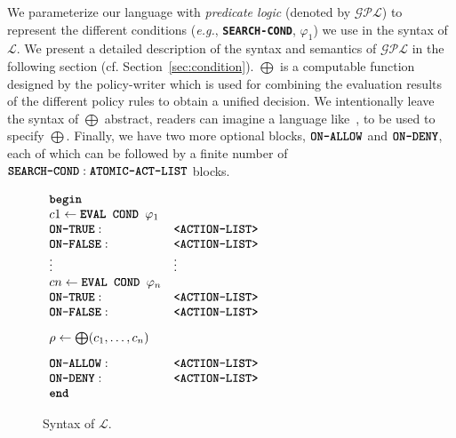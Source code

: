 \documentclass{sig-alternate}
\newcommand{\eg}{\textit{e.g.}\xspace}
\newcommand{\state}{\ensuremath{\pi}\xspace}
\newcommand{\policyfunc}{\ensuremath{\Psi}\xspace}
\newcommand{\planguage}{\ensuremath{\mathbf{\mathcal{GPL}}}\xspace}
\newcommand{\funcname}[1]{\textbf{\texttt{#1}}}
\newcommand{\policy}{\ensuremath{\varphi}\xspace}
\newcommand{\cL}{\ensuremath{\mathcal{L}}\xspace}
\begin{document}

We parameterize our language with \emph{predicate logic} (denoted by \planguage) to represent the different 
conditions (\eg,  \funcname{SEARCH-COND}, $\policy_1$) we use in the syntax of \cL. 
We present a detailed description of the syntax and semantics of \planguage in the 
following section (cf. Section~\ref{sec:condition}).  
$\bigoplus$ is a computable function designed by the policy-writer which is used 
for combining the evaluation results of the different policy rules to obtain a unified 
decision. We intentionally leave the syntax of $\bigoplus$ abstract, readers can imagine a 
language like~\cite{NINGHUI-POLICY-COMBINATION,POLICY-ALGEBRA}, 
to be used to specify $\bigoplus$. Finally, we have two more optional blocks, $\funcname{ON-ALLOW}$ and $\funcname{ON-DENY}$, 
each of which can be followed by  a finite number of $\funcname{SEARCH-COND}: \funcname{ATOMIC-ACT-LIST}$ blocks. 

\begin{figure}[t]
\centering
$
\begin{array}{lll}
\funcname{begin}   & & \\
 c1 \leftarrow   \funcname{EVAL COND  } \policy_1 &  &\\
     \funcname{ON-TRUE}: & \funcname{<ACTION-LIST>} &\\
     \funcname{ON-FALSE}: & \funcname{<ACTION-LIST>} &\\
  \vdots & \vdots & \\
 cn \leftarrow  \funcname{EVAL COND  } \policy_n &  &\\
     \funcname{ON-TRUE}: & \funcname{<ACTION-LIST>} &\\
     \funcname{ON-FALSE}: & \funcname{<ACTION-LIST>}&\\[2ex]
 \rho\leftarrow  \bigoplus(c_1,\ldots,c_n)  & &\\[2ex]
     \funcname{ON-ALLOW}: & \funcname{<ACTION-LIST>}&\\
     \funcname{ON-DENY}: & \funcname{<ACTION-LIST>}&\\
\funcname{end}    & &
\end{array}
$
\caption{Syntax of \cL.\label{fig:syntax}} 
\end{figure}
\end{document}
